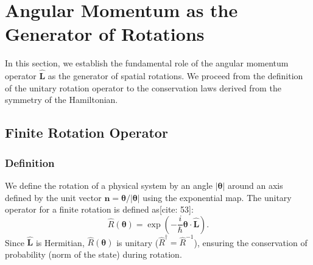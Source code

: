 \section{Angular Momentum as the Generator of Rotations}

In this section, we establish the fundamental role of the angular momentum operator $\hat{\mathbf{L}}$ as the generator of spatial rotations. We proceed from the definition of the unitary rotation operator to the conservation laws derived from the symmetry of the Hamiltonian.

\subsection{Finite Rotation Operator}

\subsubsection{Definition}
We define the rotation of a physical system by an angle $|\boldsymbol{\theta}|$ around an axis defined by the unit vector $\mathbf{n} = \boldsymbol{\theta}/|\boldsymbol{\theta}|$ using the exponential map. The unitary operator for a finite rotation is defined as[cite: 53]:
\begin{equation}
    \hat{R}(\boldsymbol{\theta}) = \exp\left(-\frac{i}{\hbar} \boldsymbol{\theta} \cdot \hat{\mathbf{L}}\right).
\end{equation}
Since $\hat{\mathbf{L}}$ is Hermitian, $\hat{R}(\boldsymbol{\theta})$ is unitary ($\hat{R}^\dagger = \hat{R}^{-1}$), ensuring the conservation of probability (norm of the state) during rotation.


